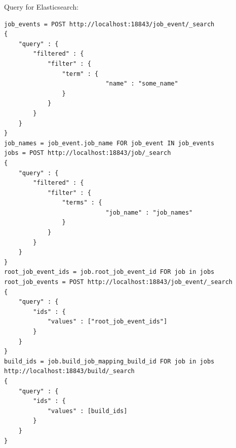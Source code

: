 



%
%
%
%


Query for Elasticsearch:
\begin{verbatim}
job_events = POST http://localhost:18843/job_event/_search
{
    "query" : {
        "filtered" : {
            "filter" : {
                "term" : {
                            "name" : "some_name"
                }
            }
        }
    }
}
job_names = job_event.job_name FOR job_event IN job_events
jobs = POST http://localhost:18843/job/_search
{
    "query" : {
        "filtered" : {
            "filter" : {
                "terms" : {
                            "job_name" : "job_names"
                }
            }
        }
    }
}
root_job_event_ids = job.root_job_event_id FOR job in jobs
root_job_events = POST http://localhost:18843/job_event/_search
{ 
    "query" : {
        "ids" : { 
            "values" : ["root_job_event_ids"]
        }
    }
}
build_ids = job.build_job_mapping_build_id FOR job in jobs
http://localhost:18843/build/_search
{ 
    "query" : {
        "ids" : { 
            "values" : [build_ids]
        }
    }
}
\end{verbatim}

